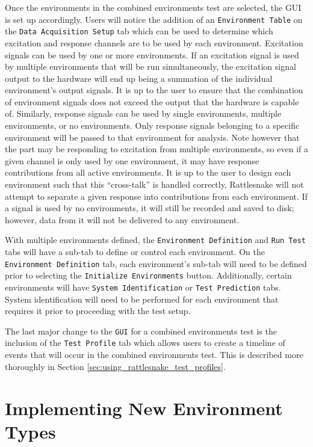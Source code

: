 \documentclass[pdf,12pt,report]{SANDreport}
\newcommand{\inlineCode}{\lstinline[basicstyle=\bfseries\ttfamily]}
\begin{document}
    Once the environments in the combined environments test are selected, the \ac{GUI} is set up accordingly.  Users will notice the addition of an \inlineCode{Environment Table} on the \inlineCode{Data Acquisition Setup} tab which can be used to determine which excitation and response channels are to be used by each environment.  Excitation signals can be used by one or more environments.  If an excitation signal is used by multiple environments that will be run simultaneously, the excitation signal output to the hardware will end up being a summation of the individual environment's output signals.  It is up to the user to ensure that the combination of environment signals does not exceed the output that the hardware is capable of.  Similarly, response signals can be used by single environments, multiple environments, or no environments.  Only response signals belonging to a specific environment will be passed to that environment for analysis.  Note however that the part may be responding to excitation from multiple environments, so even if a given channel is only used by one environment, it may have response contributions from all active environments.  It is up to the user to design each environment such that this ``cross-talk'' is handled correctly, Rattlesnake will not attempt to separate a given response into contributions from each environment.  If a signal is used by no environments, it will still be recorded and saved to disk; however, data from it will not be delivered to any environment.
    
    With multiple environments defined, the \inlineCode{Environment Definition} and \inlineCode{Run Test} tabs will have a sub-tab to define or control each environment.  On the \inlineCode{Environment Definition} tab, each environment's sub-tab will need to be defined prior to selecting the \inlineCode{Initialize Environments} button.  Additionally, certain environments will have \inlineCode{System Identification} or \inlineCode{Test Prediction} tabs.  System identification will need to be performed for each environment that requires it prior to proceeding with the test setup.
    
    The last major change to the \inlineCode{GUI} for a combined environments test is the inclusion of the \inlineCode{Test Profile} tab which allows users to create a timeline of events that will occur in the combined environments test.  This is described more thoroughly in Section \ref{sec:using_rattlesnake_test_profiles}.
    
    \chapter{Implementing New Environment Types}\label{sec:rattlesnake_environments_implementation}
    
\end{document}
